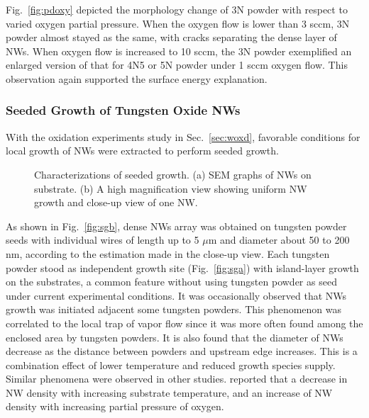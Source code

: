 Fig.~\ref{fig:pdoxy} depicted the morphology change of 3N powder with respect to varied oxygen partial pressure. When the oxygen flow is lower than 3 sccm, 3N powder almost stayed as the same, with cracks separating the dense layer of NWs. When oxygen flow is increased to 10 sccm, the 3N powder exemplified an enlarged version of that for 4N5 or 5N powder under 1 sccm oxygen flow. This observation again supported the surface energy explanation.

\subsubsection{Seeded Growth of Tungsten Oxide NWs}
With the oxidation experiments study in Sec.~\ref{sec:woxd}, favorable conditions for local growth of NWs were extracted to perform seeded growth. 

\begin{figure}[htb]
\centering
{}\hspace{0.04\textwidth}
\caption[Characterization of seeded growth : SEM]{Characterizations of seeded growth. (a) SEM graphs of  NWs on  substrate. (b) A high magnification view showing uniform NW growth and close-up view of one NW. }
\label{fig:woseedsem}
\end{figure}

As shown in Fig.~\ref{fig:sgb}, dense NWs array was obtained on tungsten powder seeds with individual wires of length up to 5 $\mu$m and diameter about 50 to 200 nm, according to the estimation made in the close-up view. Each tungsten powder stood as independent growth site (Fig.~\ref{fig:sga}) with island-layer growth on the substrates, a common feature without using tungsten powder as seed under current experimental conditions. It was occasionally observed that NWs growth was initiated adjacent some tungsten powders. This phenomenon was correlated to the local trap of vapor flow since it was more often found among the enclosed area by tungsten powders. It is also found that the diameter of NWs decrease as the distance between powders and upstream edge increases. This is a combination effect of lower temperature and reduced  growth species supply. Similar phenomena were observed in other studies. \citeauthor{Thangala2007} reported that a decrease in NW density with increasing substrate temperature, and an increase of NW density with increasing partial pressure of oxygen.\cite{Thangala2007}

